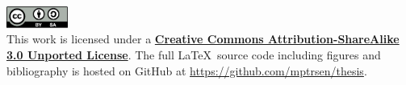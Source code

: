 \thispagestyle{empty}
\null
\vfill
\noindent
\href{http://creativecommons.org/licenses/by-sa/3.0/}{\includegraphics[width=0.15\textwidth]{img/license-cc-attribution-sharealike.pdf}}\\
This work is licensed under a
\textbf{\href{http://creativecommons.org/licenses/by-sa/3.0/}{Creative Commons
Attribution-ShareAlike 3.0 Unported License}}. The full \LaTeX~source code
including figures and bibliography is hosted on GitHub at
\url{https://github.com/mptrsen/thesis}.
